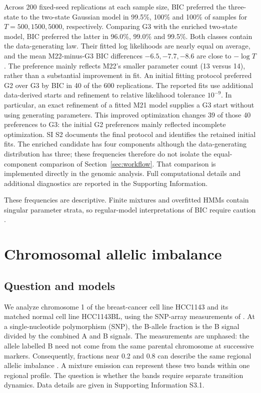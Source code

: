 \documentclass[11pt]{article}
\theoremstyle{definition}
\begin{document}
Across 200 fixed-seed replications at each sample size, BIC preferred the
three-state to the two-state Gaussian model in 99.5\%, 100\% and 100\% of
samples for $T=500,1500,5000$, respectively. Comparing G3 with the enriched
two-state model, BIC preferred the latter in 96.0\%, 99.0\% and 99.5\%.
Both classes contain the data-generating law. Their fitted log likelihoods
are nearly equal on average, and the mean M22-minus-G3 BIC differences
$-6.5,-7.7,-8.6$ are close to $-\log T$. The preference mainly reflects
M22's smaller parameter count (13 versus 14), rather than a substantial
improvement in fit.
An initial fitting protocol preferred G2 over G3 by BIC in 40 of the 600
replications. The reported fits use additional data-derived starts and
refinement to relative likelihood tolerance $10^{-9}$. In particular, an
exact refinement of a fitted M21 model supplies a G3 start without using
generating parameters. This improved optimization changes 39 of those 40
preferences to G3: the initial G2 preferences mainly reflected incomplete
optimization. SI S2 documents the final protocol and identifies the
retained initial fits.
The enriched candidate has four components although the
data-generating distribution has three; these frequencies therefore do not
isolate the equal-component comparison of Section~\ref{sec:workflow}.
That comparison is implemented directly in the genomic analysis. Full
computational details and additional diagnostics are reported in the Supporting Information.

These frequencies are descriptive. Finite mixtures and overfitted HMMs contain
singular parameter strata, so regular-model interpretations of BIC require
caution \citep{Keribin2000,RousseauMengersen2011,GassiatRousseau2014,Watanabe2013,DrtonPlummer2017}.

\section{Chromosomal allelic imbalance}\label{sec:genomic}

\subsection{Question and models}\label{sec:genomic-question}

We analyze chromosome 1 of the breast-cancer cell line HCC1143 and its
matched normal cell line HCC1143BL, using the SNP-array measurements of
\citet{ChiangEtAl2009}. At a single-nucleotide polymorphism (SNP), the
B-allele fraction is the B signal divided by the combined A and B signals.
The measurements are unphased: the allele labelled B need not come from the
same parental chromosome at successive markers. Consequently, fractions
near 0.2 and 0.8 can describe the same regional allelic imbalance
\citep{OlshenEtAl2011}. A mixture emission can represent these two bands
within one regional profile. The question is whether the bands require
separate transition dynamics. Data details are given in Supporting
Information S3.1.
\end{document}
